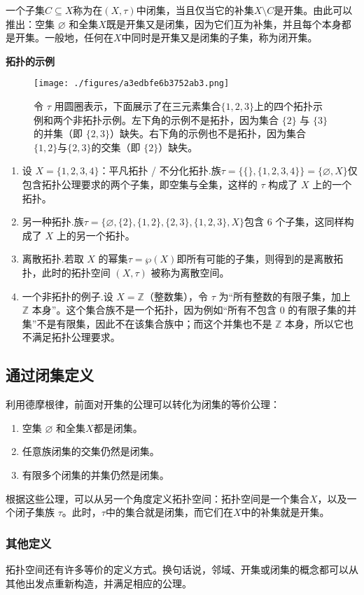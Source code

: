 一个子集$C \subseteq X$称为在$(X, \tau)$中闭集，当且仅当它的补集$X \setminus C$是开集。由此可以推出：空集 $\varnothing$ 和全集$X$既是开集又是闭集，因为它们互为补集，并且每个本身都是开集。一般地，任何在$X$中同时是开集又是闭集的子集，称为闭开集。

\textbf{拓扑的示例}
\begin{figure}[ht]
\centering
\texttt{[image: ./figures/a3edbfe6b3752ab3.png]}
\caption{令 $\tau$ 用圆圈表示，下面展示了在三元素集合$\{1, 2, 3\}$上的四个拓扑示例和两个非拓扑示例。左下角的示例不是拓扑，因为集合 $\{2\}$ 与 $\{3\}$ 的并集（即 $\{2, 3\}$）缺失。右下角的示例也不是拓扑，因为集合 $\{1, 2\}$与$\{2, 3\}$的交集（即 $\{2\}$）缺失。} \label{fig_TPKJ_1}
\end{figure}
\begin{enumerate}
\item 设 $X = \{1, 2, 3, 4\}$：平凡拓扑 / 不分化拓扑.族$\tau = \{\{\}, \{1, 2, 3, 4\}\} = \{\varnothing, X\}$仅包含拓扑公理要求的两个子集，即空集与全集，这样的 $\tau$ 构成了 $X$ 上的一个拓扑。
\item 另一种拓扑.族$\tau = \{\varnothing, \{2\}, \{1, 2\}, \{2, 3\}, \{1, 2, 3\}, X\}$包含 6 个子集，这同样构成了 $X$ 上的另一个拓扑。
\item 离散拓扑.若取 $X$ 的幂集$\tau = \wp(X)$即所有可能的子集，则得到的是离散拓扑，此时的拓扑空间 $(X, \tau)$ 被称为离散空间。
\item 一个非拓扑的例子.设 $X = \mathbb{Z}$（整数集），令 $\tau$ 为“所有整数的有限子集，加上 $\mathbb{Z}$ 本身”。这个集合族不是一个拓扑，因为例如“所有不包含 0 的有限子集的并集”不是有限集，因此不在该集合族中；而这个并集也不是 $\mathbb{Z}$ 本身，所以它也不满足拓扑公理要求。
\end{enumerate}
\subsection{通过闭集定义}
利用德摩根律，前面对开集的公理可以转化为闭集的等价公理：
\begin{enumerate}
\item 空集 $\varnothing$ 和全集$X$都是闭集。
\item 任意族闭集的交集仍然是闭集。
\item 有限多个闭集的并集仍然是闭集。
\end{enumerate}
根据这些公理，可以从另一个角度定义拓扑空间：拓扑空间是一个集合$X$，以及一个闭子集族 $\tau$。此时，$\tau$中的集合就是闭集，而它们在$X$中的补集就是开集。
\subsubsection{其他定义}
拓扑空间还有许多等价的定义方式。换句话说，邻域、开集或闭集的概念都可以从其他出发点重新构造，并满足相应的公理。

